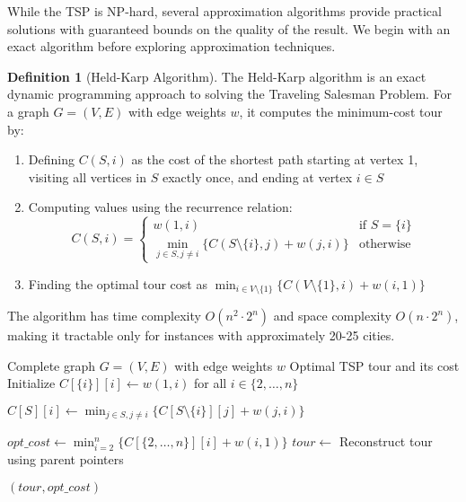 \documentclass{article}
\theoremstyle{definition}
\newtheorem{definition}{Definition}
\begin{document}
While the TSP is NP-hard, several approximation algorithms provide practical solutions with guaranteed bounds on the quality of the result. We begin with an exact algorithm before exploring approximation techniques.

\begin{definition}[Held-Karp Algorithm]
The Held-Karp algorithm is an exact dynamic programming approach to solving the Traveling Salesman Problem. For a graph $G = (V, E)$ with edge weights $w$, it computes the minimum-cost tour by:
\begin{enumerate}
    \item Defining $C(S, i)$ as the cost of the shortest path starting at vertex 1, visiting all vertices in $S$ exactly once, and ending at vertex $i \in S$
    \item Computing values using the recurrence relation:
    \begin{equation}
        C(S, i) = 
        \begin{cases}
            w(1,i) & \text{if } S = \{i\} \\
            \min_{j \in S, j \neq i} \{C(S \setminus \{i\}, j) + w(j,i)\} & \text{otherwise}
        \end{cases}
    \end{equation}
    \item Finding the optimal tour cost as $\min_{i \in V \setminus \{1\}} \{C(V \setminus \{1\}, i) + w(i,1)\}$
\end{enumerate}
The algorithm has time complexity $O(n^2 \cdot 2^n)$ and space complexity $O(n \cdot 2^n)$, making it tractable only for instances with approximately 20-25 cities.
\end{definition}

\begin{algorithm}[H]
\caption{Held-Karp Algorithm}
\begin{algorithmic}[1]
\Require Complete graph $G = (V, E)$ with edge weights $w$
\Ensure Optimal TSP tour and its cost
    \State Initialize $C[\{i\}][i] \leftarrow w(1, i)$ for all $i \in \{2,\ldots,n\}$
    
                \State $C[S][i] \leftarrow \min_{j \in S, j \neq i} \{C[S \setminus \{i\}][j] + w(j, i)\}$
            \EndFor
        \EndFor
    \EndFor
    
    \State $opt\_cost \leftarrow \min_{i=2}^{n} \{C[\{2,\ldots,n\}][i] + w(i, 1)\}$
    \State $tour \leftarrow$ Reconstruct tour using parent pointers
    
    \State \Return $(tour, opt\_cost)$
\EndFunction
\end{algorithmic}
\end{algorithm}
\end{document}
